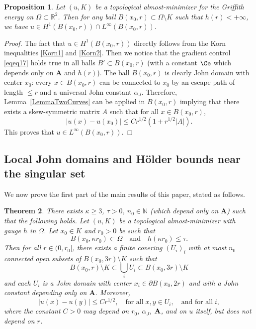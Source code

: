 \documentclass[12pt]{article}
\newtheorem{theorem}{Theorem}[section]
\newtheorem{proposition}[theorem]{Proposition}
\theoremstyle{definition}
\theoremstyle{remark}
\numberwithin{equation}{section}
\newcommand{\abs}[1]{\lvert #1 \rvert}
\newcommand{\R}{\mathbb{R}}
\newcommand{\N}{\mathbb{N}}
\newcommand{\A}{\mathbf{A}}
\begin{document}
\begin{proposition}\label{reginterieure}
    Let $(u,K)$ be a topological almost-minimizer for the Griffith energy on $\Omega\subset \R^2$. Then for any ball $B(x_0,r) \subset \Omega \setminus K$ such that $h(r) < +\infty$, we have $u\in H^1(B(x_0,r))\cap L^\infty(B(x_0,r))$.
\end{proposition}
\begin{proof}
    The fact that $u\in H^1(B(x_0,r))$ directly follows from the Korn inequalities \eqref{Korn1} and
    \eqref{Korn2}. Then we notice that the gradient control \eqref{eqeq17} holds true in all balls $B' \subset B(x_0,r)$ (with a constant $\Ce$ which depends only on $\A$ and $h(r)$).
    The ball $B(x_0,r)$ is clearly John domain with center $x_0$: every $x \in B(x_0,r)$ can be connected to $x_0$ by an escape path of length $\leq r$ and a universal John constant $\alpha_J$.
    Therefore, Lemma~\ref{LemmaTwoCurves} can be applied in $B(x_0,r)$ implying that there exists a skew-symmetric matrix $A$ such that for all $x \in B(x_0,r)$,
    \begin{equation*}
        \abs{u(x) - u(x_0)} \leq C r^{1/2} (1 + r^{1/2} \abs{A}).
    \end{equation*}
    This proves that $u \in L^{\infty}(B(x_0,r))$.
\end{proof}



\subsection{Local John domains and H\"older bounds near the singular set}
\label{SubsectionNearSing}

We now prove the first part of the main results of  this paper, stated as follows.

\begin{theorem}\label{holderestim}
    There exists $\kappa \geq 3$, $\tau > 0$, $n_0 \in \N$ (which depend only on $\A$) such that the following holds.
    Let $(u,K)$ be a topological almost-minimizer with gauge $h$ in $\Omega$.
    Let $x_0 \in K$ and $r_0 > 0$ be such that
    \begin{equation*}
        B(x_0,\kappa r_0) \subset \Omega \quad \text{and} \quad h(\kappa r_0) \leq \tau.
    \end{equation*}
    Then   for all $r \in (0,r_0]$,
    there exists a finite covering $(U_i)_i$ with at most $n_0$ connected open subsets of $B(x_0,3r) \setminus K$ such that
    \begin{equation}
        B(x_0,r)\setminus K\subset \bigcup_i U_i\subset B(x_0,3r)\setminus K
    \end{equation}
    and each $U_i$ is a John domain with center $x_i\in \partial B(x_0,2r)$ and with a John constant depending only on $\A$. Moreover, 
    \begin{equation}
        |u(x)-u(y)|\leq Cr^{1/2},\quad \text{for all} \; x,y\in U_i,\quad \text{and for all} \; i, \label{estiMM}
    \end{equation}
where the constant $C>0$  may depend on  $r_0$, $\alpha_J$, $\bf A$, and on  $u$ itself, but does not depend on $r$.\end{theorem}
\end{document}
